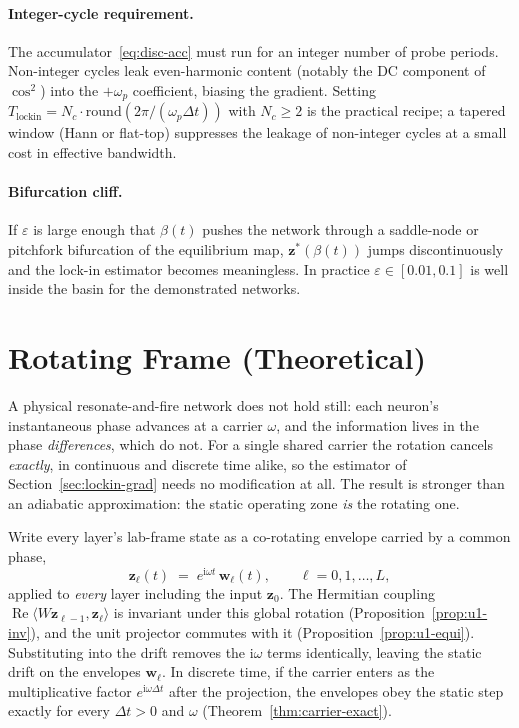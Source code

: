 \documentclass[11pt]{article}
\newcommand{\im}{\mathrm{i}}
\newcommand{\dt}{\Delta t}
\theoremstyle{definition}
\DeclareMathOperator{\Real}{Re}
\begin{document}
\paragraph{Integer-cycle requirement.}
The accumulator~\eqref{eq:disc-acc} must run for an integer number of
probe periods.  Non-integer cycles leak even-harmonic content (notably
the DC component of $\cos^2$) into the $+\omega_p$ coefficient,
biasing the gradient.  Setting
$T_\text{lockin} = N_c \cdot \mathrm{round}(2\pi/(\omega_p\dt))$ with
$N_c \ge 2$ is the practical recipe; a tapered window (Hann or
flat-top) suppresses the leakage of non-integer cycles at a small cost
in effective bandwidth.

\paragraph{Bifurcation cliff.}
If $\varepsilon$ is large enough that $\beta(t)$ pushes the network
through a saddle-node or pitchfork bifurcation of the equilibrium map,
$\bm{z}^*(\beta(t))$ jumps discontinuously and the lock-in estimator
becomes meaningless.  In practice $\varepsilon \in [0.01, 0.1]$ is
well inside the basin for the demonstrated networks.

\section{Rotating Frame (Theoretical)}\label{sec:carrier}

A physical resonate-and-fire network does not hold still: each
neuron's instantaneous phase advances at a carrier $\omega$, and the
information lives in the phase \emph{differences}, which do not.  For
a single shared carrier the rotation cancels \emph{exactly}, in
continuous and discrete time alike, so the estimator of
Section~\ref{sec:lockin-grad} needs no modification at all.  The
result is stronger than an adiabatic approximation: the static
operating zone \emph{is} the rotating one.

Write every layer's lab-frame state as a co-rotating envelope carried
by a common phase,
\begin{equation}\label{eq:corot-sub}
  \bm{z}_\ell(t) \;=\; e^{\im\omega t}\,\bm{w}_\ell(t),
  \qquad \ell = 0,1,\dots,L,
\end{equation}
applied to \emph{every} layer including the input $\bm{z}_0$.  The
Hermitian coupling $\Real\langle W\bm{z}_{\ell-1},\bm{z}_\ell\rangle$
is invariant under this global rotation (Proposition~\ref{prop:u1-inv}),
and the unit projector commutes with it (Proposition~\ref{prop:u1-equi}).
Substituting into the drift removes the $\im\omega$ terms identically,
leaving the static drift on the envelopes $\bm{w}_\ell$.  In discrete
time, if the carrier enters as the multiplicative factor
$e^{\im\omega\dt}$ after the projection, the envelopes obey the static
step exactly for every $\dt>0$ and $\omega$ (Theorem~\ref{thm:carrier-exact}).
\end{document}
